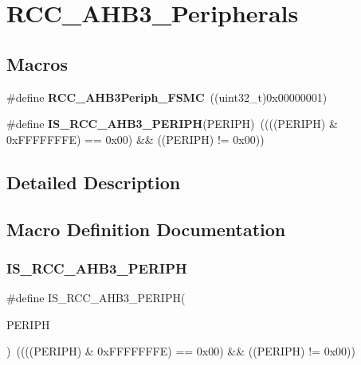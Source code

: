 \section{R\+C\+C\+\_\+\+A\+H\+B3\+\_\+\+Peripherals}
\label{group__RCC__AHB3__Peripherals}
\subsection*{Macros}
\begin{DoxyCompactItemize}
\item 
\#define \textbf{ R\+C\+C\+\_\+\+A\+H\+B3\+Periph\+\_\+\+F\+S\+MC}~((uint32\+\_\+t)0x00000001)
\item 
\#define \textbf{ I\+S\+\_\+\+R\+C\+C\+\_\+\+A\+H\+B3\+\_\+\+P\+E\+R\+I\+PH}(P\+E\+R\+I\+PH)~((((P\+E\+R\+I\+PH) \& 0x\+F\+F\+F\+F\+F\+F\+F\+E) == 0x00) \&\& ((\+P\+E\+R\+I\+P\+H) != 0x00))
\end{DoxyCompactItemize}


\subsection{Detailed Description}


\subsection{Macro Definition Documentation}
\mbox{\label{group__RCC__AHB3__Peripherals_ga8d269d2fbf78cf494ea127d1a6daec31}} 
\subsubsection{I\+S\+\_\+\+R\+C\+C\+\_\+\+A\+H\+B3\+\_\+\+P\+E\+R\+I\+PH}
{\footnotesize\ttfamily \#define I\+S\+\_\+\+R\+C\+C\+\_\+\+A\+H\+B3\+\_\+\+P\+E\+R\+I\+PH(\begin{DoxyParamCaption}\item[{}]{P\+E\+R\+I\+PH }\end{DoxyParamCaption})~((((P\+E\+R\+I\+PH) \& 0x\+F\+F\+F\+F\+F\+F\+F\+E) == 0x00) \&\& ((\+P\+E\+R\+I\+P\+H) != 0x00))}



